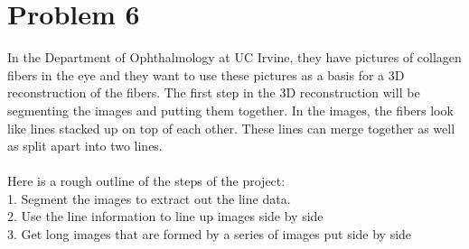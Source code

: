 \documentclass[11pt,psfig]{article}
\begin{document}
\newpage

\section*{Problem 6}

In the Department of Ophthalmology at UC Irvine, they have pictures of collagen fibers in the eye and they want to use these pictures as a basis for a 3D reconstruction of the fibers. The first step in the 3D reconstruction will be segmenting the images and putting them together. In the images, the fibers look like lines stacked up on top of each other. These lines can merge together as well as split apart into two lines. \\
\\
Here is a rough outline of the steps of the project: \\
1. Segment the images to extract out the line data. \\
2. Use the line information to line up images side by side \\
3. Get long images that are formed by a series of images put side by side \\
\end{document}
